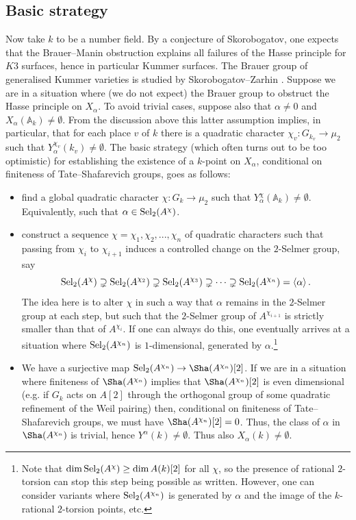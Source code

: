 \documentclass[10pt]{amsart}
\numberwithin{equation}{section}
\theoremstyle{remark}
\theoremstyle{definition}
\theoremstyle{definition}
\theoremstyle{definition}
\theoremstyle{definition}
\theoremstyle{definition}
\theoremstyle{definition}
\theoremstyle{definition}
\theoremstyle{definition}
\begin{document}
\subsection{Basic strategy} \label{subsec:basic_strategy}
Now take $k$ to be a number field.  By a conjecture of Skorobogatov, one expects that the Brauer--Manin obstruction explains all failures of the Hasse principle for $K3$ surfaces, hence in particular Kummer surfaces. The Brauer group of generalised Kummer varieties is studied by Skorobogatov--Zarhin \cite{SZ17}. Suppose we are in a situation where (we do not expect) the Brauer group to obstruct the Hasse principle on $X_\alpha$.  To avoid trivial cases, suppose also that $\alpha \neq 0$ and $X_\alpha(\mathbb{A}_k)\neq \emptyset$. From the discussion above this latter assumption implies, in particular, that for each place $v$ of $k$ there is a quadratic character $\chi_v:G_{k_v}\to \mu_2$ such that $Y_\alpha^{\chi_v}(k_v)\neq \emptyset$. The basic strategy (which often turns out to be too optimistic) for establishing the existence of a $k$-point on $X_\alpha$, conditional on finiteness of Tate--Shafarevich groups, goes as follows: 
 \begin{itemize}
 \item[(1)] find a global quadratic character $\chi:G_k\to \mu_2$ such that $Y_\alpha^\chi(\mathbb{A}_k)\neq \emptyset$. Equivalently, such that $\alpha \in \textup{Sel}_2(A^\chi)$.  
 \item[(2)] construct a sequence $\chi=\chi_1,\chi_2,...,\chi_n$ of quadratic characters such that passing from $\chi_i$ to $\chi_{i+1}$ induces a controlled change on the $2$-Selmer group, say
 \[\textup{Sel}_2(A^\chi)\supsetneq \textup{Sel}_2(A^{\chi_2})\supsetneq\textup{Sel}_2(A^{\chi_3})\supsetneq \dots \supsetneq  \textup{Sel}_2(A^{\chi_n})=\left \langle \alpha \right \rangle.\]
 The idea here is to alter $\chi$ in such a way that $\alpha$ remains in the $2$-Selmer group at each step, but such that the $2$-Selmer group of $A^{\chi_{i+1}}$ is strictly smaller than that of $A^{\chi_{i}}$. If one can always do this, one eventually arrives at a situation where $\textup{Sel}_2(A^{\chi_n})$ is $1$-dimensional, generated by $\alpha$.\footnote{Note that  $\dim \textup{Sel}_2(A^{\chi})\geq \dim A(k)[2]$ for all $\chi$, so the presence of rational $2$-torsion can stop this step being possible as written. However, one can consider variants where $\textup{Sel}_2(A^{\chi_n})$ is generated by $\alpha$ and the image  of the $k$-rational $2$-torsion points, etc.}  
 \item[(3)] We have a surjective map $\textup{Sel}_2(A^{\chi_n})\to \Sha(A^{\chi_n})[2]$. If we are in a situation where finiteness of $\Sha(A^{\chi_n})$ implies that $\Sha(A^{\chi_n})[2]$ is even dimensional (e.g. if $G_k$ acts on $A[2]$ through the orthogonal group of some quadratic refinement of the Weil pairing) then, conditional on finiteness of Tate--Shafarevich groups, we must have  $\Sha(A^{\chi_n})[2]=0$. Thus, the class of $\alpha$ in $\Sha(A^{\chi_n})$ is trivial, hence $Y^\alpha(k)\neq \emptyset$. Thus also $X_\alpha(k)\neq \emptyset$. 
 \end{itemize}
\end{document}
